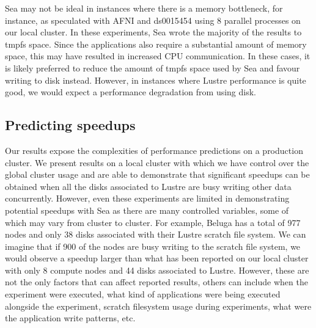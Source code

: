     Sea may not be ideal in instances where there is a memory bottleneck, for instance, as speculated
    with AFNI and ds0015454 using 8 parallel processes on our local cluster. In these experiments, Sea wrote the majority of the results to tmpfs space.
    Since the applications also require a substantial amount of memory space,
    this may have resulted in increased CPU communication. In these cases, it
    is likely preferred to reduce the amount of tmpfs space used by Sea and
    favour writing to disk instead. However, in instances where Lustre
    performance is quite good, we would expect a performance degradation from
    using disk.


    \subsection{Predicting speedups}

    Our results expose the complexities of performance predictions on a
    production cluster. We present results on a local cluster with which we have
    control over the global cluster usage and are able to demonstrate that
    significant speedups can be obtained when all the disks associated to Lustre
    are busy writing other data concurrently. However, even these experiments
    are limited in demonstrating potential speedups with Sea as there are many
    controlled variables, some of which may vary from cluster to cluster. For
    example, Beluga has a total of 977 nodes and only 38 disks associated with
    their Lustre scratch file system. We can imagine that if 900 of the nodes
    are busy writing to the scratch file system, we would observe a speedup
    larger than what has been reported on our local cluster with only 8 compute
    nodes and 44 disks associated to Lustre. However, these are not the only
    factors that can affect reported results, others can include when the
    experiment were executed, what kind of applications were being executed
    alongside the experiment, scratch filesystem usage during experiments, what
    were the application write patterns, etc.

